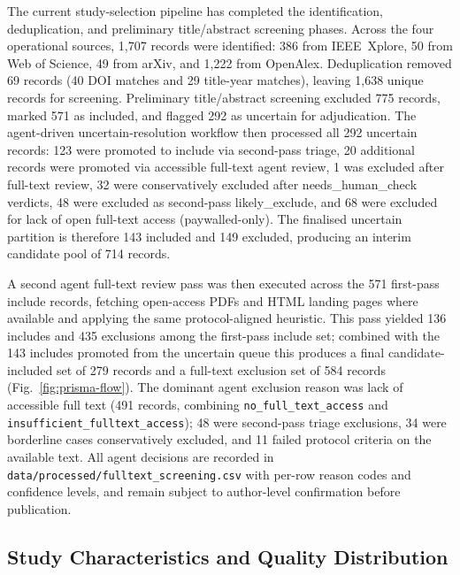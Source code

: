 \documentclass[journal]{IEEEtran}
\begin{document}
The current study-selection pipeline has completed the identification, deduplication, and preliminary title/abstract screening phases.
Across the four operational sources, 1,707 records were identified: 386 from IEEE~Xplore, 50 from Web of Science, 49 from arXiv, and 1,222 from OpenAlex.
Deduplication removed 69 records (40 DOI matches and 29 title-year matches), leaving 1,638 unique records for screening.
Preliminary title/abstract screening excluded 775 records, marked 571 as included, and flagged 292 as uncertain for adjudication.
The agent-driven uncertain-resolution workflow then processed all 292 uncertain records: 123 were promoted to include via second-pass triage, 20 additional records were promoted via accessible full-text agent review, 1 was excluded after full-text review, 32 were conservatively excluded after needs\_human\_check verdicts, 48 were excluded as second-pass likely\_exclude, and 68 were excluded for lack of open full-text access (paywalled-only).
The finalised uncertain partition is therefore 143 included and 149 excluded, producing an interim candidate pool of 714 records.

A second agent full-text review pass was then executed across the 571 first-pass include records, fetching open-access PDFs and HTML landing pages where available and applying the same protocol-aligned heuristic.
This pass yielded 136 includes and 435 exclusions among the first-pass include set; combined with the 143 includes promoted from the uncertain queue this produces a final candidate-included set of 279 records and a full-text exclusion set of 584 records (Fig.~\ref{fig:prisma-flow}).
The dominant agent exclusion reason was lack of accessible full text (491 records, combining \texttt{no\_full\_text\_access} and \texttt{insufficient\_fulltext\_access}); 48 were second-pass triage exclusions, 34 were borderline cases conservatively excluded, and 11 failed protocol criteria on the available text.
All agent decisions are recorded in \texttt{data/processed/fulltext\_screening.csv} with per-row reason codes and confidence levels, and remain subject to author-level confirmation before publication.



\subsection{Study Characteristics and Quality Distribution}
\end{document}
